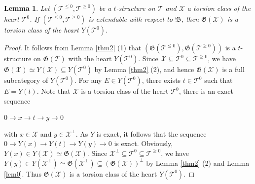 \documentclass[11pt,a4paper]{amsart}
\numberwithin{equation}{section} \theoremstyle{plain}
\newtheorem{lem}{Lemma}[section]
\numberwithin{equation}{section} \theoremstyle{definition}
\begin{document}
\begin{lem}\label{lem1}  Let $(\mathcal{T}^{\leq0},\mathcal{T}^{\geq0})$ be a $t$-structure on $\mathcal{T}$ and $\mathcal{X}$ a torsion class of the heart $\mathcal{T}^{0}$. If $(\mathcal{T}^{\leq0},\mathcal{T}^{\geq0})$ is extendable with respect to $\mathfrak{B}$, then $\mathfrak{G}(\mathcal{X})$ is a torsion class of the heart $Y(\mathcal{T}^{0})$.
\end{lem}
\begin{proof} It follows from Lemma \ref{thm2} (1) that $(\mathfrak{G}(\mathcal{T}^{\leq0}),\mathfrak{G}(\mathcal{T}^{\geq0}))$ is a $t$-structure on $\mathfrak{G}(\mathcal{T})$ with the heart $Y(\mathcal{T}^{0})$. Since $\mathcal{X}\subseteq\mathcal{T}^{0}\subseteq\mathcal{T}^{\geq0}$, we have $\mathfrak{G}(\mathcal{X})\simeq Y(\mathcal{X})\subseteq Y(\mathcal{T}^{0})$ by Lemma \ref{thm2} (2), and hence $\mathfrak{G}(\mathcal{X})$ is a full subcategory of $Y(\mathcal{T}^{0})$. For any $E\in Y(\mathcal{T}^{0})$, there exists $t\in\mathcal{T}^{0}$ such that $E=Y(t)$. Note that $\mathcal{X}$ is a torsion class of the heart $\mathcal{T}^{0}$, there is an exact sequence
\begin{center}
$0\rightarrow x\rightarrow t\rightarrow y\rightarrow0$
\end{center}
 with $x\in\mathcal{X}$ and $y\in\mathcal{X}^{\perp}$. As $Y$ is exact, it follows that the sequence $0\rightarrow Y(x)\rightarrow Y(t)\rightarrow Y(y)\rightarrow0$ is exact. Obviously, $Y(x)\in Y(\mathcal{X})\simeq\mathfrak{G}(\mathcal{X})$. Since $\mathcal{X}^{\perp}\subseteq\mathcal{T}^{0}\subseteq\mathcal{T}^{\geq0}$, we have $Y(y)\in Y(\mathcal{X}^{\perp}) \simeq\mathfrak{G}(\mathcal{X}^{\perp})\subseteq(\mathfrak{G}(\mathcal{X}))^{\perp}$ by Lemma \ref{thm2} (2) and Lemma \ref{lem0}. Thus $\mathfrak{G}(\mathcal{X})$ is a torsion class of the heart $Y(\mathcal{T}^{0})$.
\end{proof}
\end{document}
